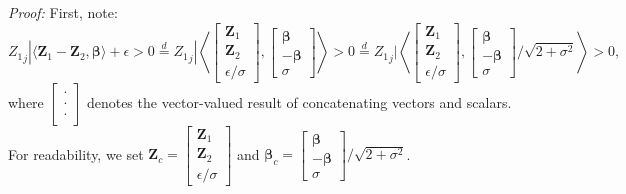 \documentclass{article} %
\begin{document}
\textit{Proof:} First, note:
\[
{Z_1}_j | \langle \mathbf{Z}_1 - \mathbf{Z}_2, \bm{\beta} \rangle + \epsilon > 0  \overset{d}{=} {Z_1}_j | \left\langle \begin{bmatrix}\mathbf{Z}_1\\\mathbf{Z}_2\\\epsilon/\sigma\end{bmatrix}, \begin{bmatrix}\bm{\beta}\\ -\bm{\beta}\\\sigma\end{bmatrix}\right\rangle > 0
\overset{d}{=} {Z_1}_j | \left\langle \begin{bmatrix}\mathbf{Z}_1\\\mathbf{Z}_2\\\epsilon/\sigma\end{bmatrix}, \begin{bmatrix}\bm{\beta}\\ -\bm{\beta}\\\sigma\end{bmatrix}/\sqrt{2+\sigma^2}\right\rangle > 0,
\]
where $\begin{bmatrix}\cdot\\ \cdot\\\cdot\end{bmatrix}$ denotes the vector-valued result of concatenating vectors and scalars. For readability, we set $\mathbf{Z}_{c} = \begin{bmatrix}\mathbf{Z}_1\\\mathbf{Z}_2\\\epsilon/\sigma\end{bmatrix}$ and $\bm{\beta}_{c} = \begin{bmatrix}\bm{\beta}\\ -\bm{\beta}\\\sigma\end{bmatrix}/\sqrt{2+\sigma^2}$.
\end{document}
